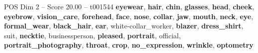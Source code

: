 \begin{textsample}{POS Dim 2 – Score 20.00 – t001544}  \label{ex:f2_pos_031}
\textbf{eyewear}, \textbf{hair}, \textbf{chin}, \textbf{glasses}, \textbf{head}, \textbf{cheek}, \textbf{eyebrow}, \textbf{vision\_care}, \textbf{forehead}, \textbf{face}, \textbf{nose}, \textbf{collar}, \textbf{jaw}, \textbf{mouth}, \textbf{neck}, \textbf{eye}, \textbf{formal\_wear}, \textbf{black\_hair}, \textbf{ear}, white-collar\_worker, \textbf{blazer}, \textbf{dress\_shirt}, suit, \textbf{necktie}, businessperson, \textbf{pleased}, \textbf{portrait}, official, \textbf{portrait\_photography}, \textbf{throat}, \textbf{crop}, \textbf{no\_expression}, \textbf{wrinkle}, \textbf{optometry}

\end{textsample}

